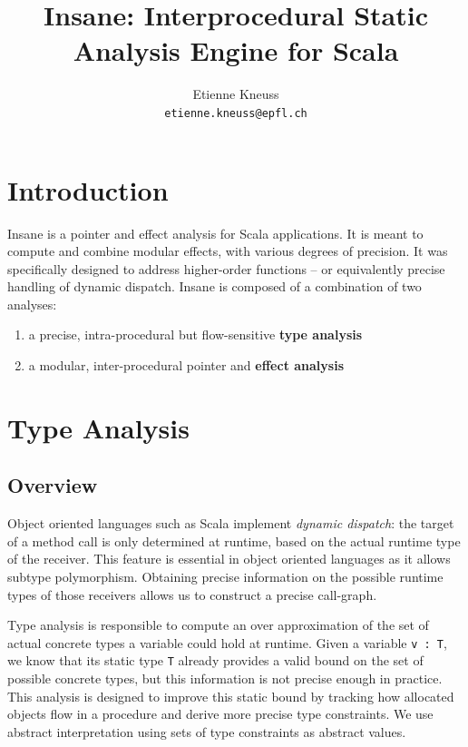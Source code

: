 \documentclass[a4paper]{article}
\author{Etienne Kneuss\\
\texttt{etienne.kneuss@epfl.ch}
}
\title{Insane: Interprocedural Static Analysis Engine for Scala}
\begin{document}
\maketitle
\section{Introduction}
Insane is a pointer and effect analysis for Scala applications. It is meant to
compute and combine modular effects, with various degrees of precision. It was
specifically designed to address higher-order functions -- or equivalently
precise handling of dynamic dispatch. Insane is composed of a combination of
two analyses:

\begin{enumerate}
    \item a precise, intra-procedural but flow-sensitive \textbf{type analysis}
    \item a modular, inter-procedural pointer and \textbf{effect analysis}
\end{enumerate}

\section{Type Analysis}
\subsection{Overview}
Object oriented languages such as Scala implement \emph{dynamic dispatch}: the
target of a method call is only determined at runtime, based on the actual
runtime type of the receiver. This feature is essential in object oriented
languages as it allows subtype polymorphism. Obtaining precise information on
the possible runtime types of those receivers allows us to construct a
precise call-graph.

Type analysis is responsible to compute an over approximation of the set of
actual concrete types a variable could hold at runtime. Given a variable
\verb=v : T=, we know that its static type \verb=T= already provides a valid
bound on the set of possible concrete types, but this information is not
precise enough in practice. This analysis is designed to improve this static
bound by tracking how allocated objects flow in a procedure and derive more
precise type constraints. We use abstract interpretation using sets of type
constraints as abstract values.
\end{document}
